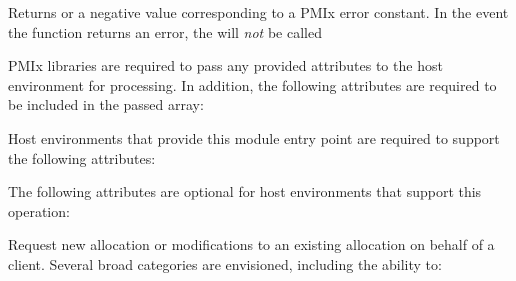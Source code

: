 \begin{arglist}
\end{arglist}

Returns  or a negative value corresponding to a PMIx error constant. In the event the function returns an error, the  will \textit{not} be called

\reqattrstart
\ac{PMIx} libraries are required to pass any provided attributes to the host environment for processing. In addition, the following attributes are required to be included in the passed  array:


Host environments that provide this module entry point are required to support the following attributes:


\reqattrend

\optattrstart
The following attributes are optional for host environments that support this operation:


\optattrend

\descr

Request new allocation or modifications to an existing allocation on behalf of a client. Several broad categories are envisioned, including the ability to:

